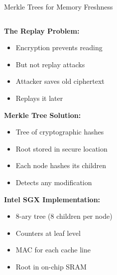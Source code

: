 \documentclass[aspectratio=169,12pt]{beamer}
\begin{document}
\begin{frame}[fragile]{Merkle Trees for Memory Freshness}
    \begin{columns}
        \begin{column}{0.5\textwidth}
            \textbf{The Replay Problem:}
            \begin{itemize}
                \item Encryption prevents reading
                \item But not replay attacks
                \item Attacker saves old ciphertext
                \item Replays it later
            \end{itemize}
            
            \vspace{0.3cm}
            \textbf{Merkle Tree Solution:}
            \begin{itemize}
                \item Tree of cryptographic hashes
                \item Root stored in secure location
                \item Each node hashes its children
                \item Detects any modification
            \end{itemize}
            
            \vspace{0.3cm}
            \textbf{Intel SGX Implementation:}
            \begin{itemize}
                \item 8-ary tree (8 children per node)
                \item Counters at leaf level
                \item MAC for each cache line
                \item Root in on-chip SRAM
            \end{itemize}
        \end{column}
        \begin{column}{0.5\textwidth}
\end{column}
\end{columns}
\end{frame}
\end{document}
